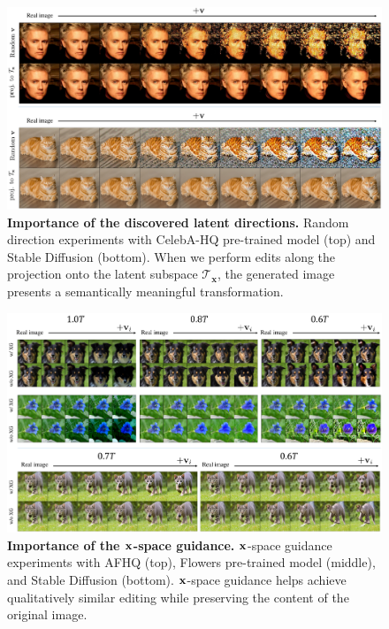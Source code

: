 \begin{figure}[!t]
    \centering
    \includegraphics[width=0.9\linewidth]{figure/random_v.pdf}
    \caption{
    \textbf{Importance of the discovered latent directions.} Random direction experiments with CelebA-HQ pre-trained model (top) and Stable Diffusion (bottom).
    {When we perform edits along the projection onto the latent subspace $\mathcal{T}_{\mathbf{x}}$, the generated image presents a semantically meaningful transformation.
    }
    }
    \label{fig:random_v}
\end{figure}

\begin{figure}[!t]
    \centering
    \includegraphics[width=1.0\linewidth]{figure/x_space_guidance.pdf}
    \caption{
    \textbf{Importance of the $\mathbf{x}$-space guidance.} 
    $\mathbf{x}$-space guidance experiments with AFHQ (top), Flowers pre-trained model (middle), and Stable Diffusion (bottom).
    $\mathbf{x}$-space guidance helps achieve qualitatively similar editing while preserving the content of the original image.}
    \label{fig:x_space_guidance}
\end{figure}


